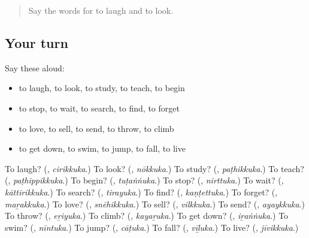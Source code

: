 \begin{quote}
Say the words for to laugh and to look.
\end{quote}

\subsection*{Your turn}
Say these aloud:

\begin{itemize}
\raggedright
  \item to laugh, to look, to study, to teach, to begin
  \item to stop, to wait, to search, to find, to forget
  \item to love, to sell, to send, to throw, to climb
  \item to get down, to swim, to jump, to fall, to live
\end{itemize}

\begin{tcolorbox}[breakable,colback=teal!4,colframe=teal!35!black,title={Before you move on}]
To laugh? (\textbf{}, \emph{cirikkuka}.) To look? (\textbf{}, \emph{nōkkuka}.) To study? (\textbf{}, \emph{paṭhikkuka}.) To teach? (\textbf{}, \emph{paṭhippikkuka}.) To begin? (\textbf{}, \emph{tuṭaṅṅuka}.) To stop? (\textbf{}, \emph{nirttuka}.) To wait? (\textbf{}, \emph{kāttirikkuka}.) To search? (\textbf{}, \emph{tirayuka}.) To find? (\textbf{}, \emph{kaṇṭettuka}.) To forget? (\textbf{}, \emph{maṟakkuka}.) To love? (\textbf{}, \emph{snēhikkuka}.) To sell? (\textbf{}, \emph{vilkkuka}.) To send? (\textbf{}, \emph{ayaykkuka}.) To throw? (\textbf{}, \emph{eṟiyuka}.) To climb? (\textbf{}, \emph{kayaṟuka}.) To get down? (\textbf{}, \emph{iṟaṅṅuka}.) To swim? (\textbf{}, \emph{nīntuka}.) To jump? (\textbf{}, \emph{cāṭuka}.) To fall? (\textbf{}, \emph{vīḻuka}.) To live? (\textbf{}, \emph{jīvikkuka}.)
\end{tcolorbox}
